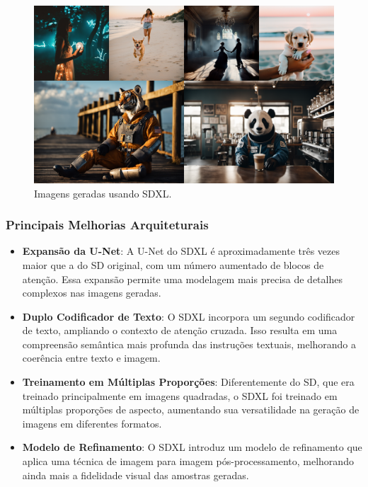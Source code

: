 \documentclass[12pt, %
openright, 
oneside, %
a4paper,    %
brazil]{facom-ufu-abntex2}
\begin{document}
\begin{figure}[H]
    \centering
        \includegraphics[width=\linewidth]{sdxl-sample-2.png}
        \caption{Imagens geradas usando SDXL.}
        \label{fig:sdxlSample2}
\end{figure}

\subsubsection*{Principais Melhorias Arquiteturais}

\begin{itemize}
    \item \textbf{Expansão da U-Net}: A U-Net do SDXL é aproximadamente três vezes maior que a do SD original, com um número aumentado de blocos de atenção. Essa expansão permite uma modelagem mais precisa de detalhes complexos nas imagens geradas.
    \item \textbf{Duplo Codificador de Texto}: O SDXL incorpora um segundo codificador de texto, ampliando o contexto de atenção cruzada. Isso resulta em uma compreensão semântica mais profunda das instruções textuais, melhorando a coerência entre texto e imagem.
    \item \textbf{Treinamento em Múltiplas Proporções}: Diferentemente do SD, que era treinado principalmente em imagens quadradas, o SDXL foi treinado em múltiplas proporções de aspecto, aumentando sua versatilidade na geração de imagens em diferentes formatos.
    \item \textbf{Modelo de Refinamento}: O SDXL introduz um modelo de refinamento que aplica uma técnica de imagem para imagem pós-processamento, melhorando ainda mais a fidelidade visual das amostras geradas.
\end{itemize}
\end{document}
